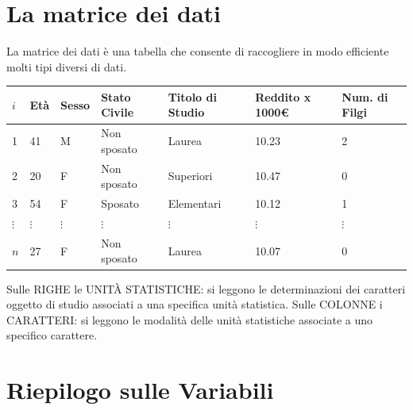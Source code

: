 \documentclass[
  11pt,
]{book}
\theoremstyle{mytheoremstyle}
\theoremstyle{mydefstyle}
\begin{document}
\section{La matrice dei dati}\label{la-matrice-dei-dati}

La matrice dei dati è una tabella che consente di raccogliere in modo efficiente molti tipi diversi di dati.

\begin{tabular}{lllllll}
\toprule
$i$ & Età & Sesso & Stato Civile & Titolo di Studio & Reddito x 1000€ & Num. di Filgi\\
\midrule
1 & 41 & M & Non sposato & Laurea & 10.23 & 2\\
2 & 20 & F & Non sposato & Superiori & 10.47 & 0\\
3 & 54 & F & Sposato & Elementari & 10.12 & 1\\
$\vdots$ & $\vdots$ & $\vdots$ & $\vdots$ & $\vdots$ & $\vdots$ & $\vdots$\\
$n$ & 27 & F & Non sposato & Laurea & 10.07 & 0\\
\bottomrule
\end{tabular}

Sulle RIGHE le UNITÀ STATISTICHE: si leggono le determinazioni dei caratteri oggetto di studio associati a una specifica unità statistica.
Sulle COLONNE i CARATTERI: si leggono le modalità delle unità statistiche associate a uno specifico carattere.

\clearpage

\section{Riepilogo sulle Variabili}\label{riepilogo-sulle-variabili}
\end{document}
